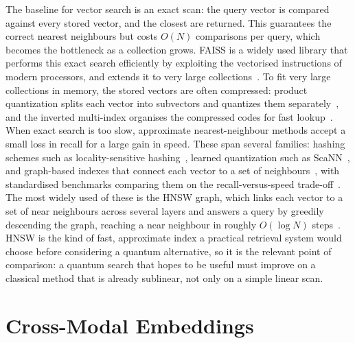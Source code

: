 The baseline for vector search is an exact scan: the query vector is compared
against every stored vector, and the closest are returned. This guarantees the
correct nearest neighbours but costs $O(N)$ comparisons per query, which becomes
the bottleneck as a collection grows. FAISS is a widely used library that
performs this exact search efficiently by exploiting the vectorised instructions
of modern processors, and extends it to very large
collections~\cite{johnson2019faiss}. To fit very large collections in memory,
the stored vectors are often compressed: product quantization splits each vector
into subvectors and quantizes them separately~\cite{jegou2011pq}, and the
inverted multi-index organises the compressed codes for fast
lookup~\cite{babenko2015multiindex}. When exact search is too slow, approximate
nearest-neighbour methods accept a small loss in recall for a large gain in
speed. These span several families: hashing schemes such as locality-sensitive
hashing~\cite{datar2004lsh}, learned quantization such as
ScaNN~\cite{guo2020scann}, and graph-based indexes that connect each vector to a
set of neighbours~\cite{fu2019nsg,subramanya2019diskann}, with standardised
benchmarks comparing them on the recall-versus-speed
trade-off~\cite{aumuller2020annbenchmarks}. The most widely used of these is the
HNSW graph, which links each vector to a set of near neighbours across several
layers and answers a query by greedily descending the graph, reaching a near
neighbour in roughly $O(\log N)$ steps~\cite{malkov2020hnsw}. HNSW is the kind of
fast, approximate index a
practical retrieval system would choose before considering a quantum
alternative, so it is the relevant point of comparison: a quantum search that
hopes to be useful must improve on a classical method that is already sublinear,
not only on a simple linear scan.

\section{Cross-Modal Embeddings}
\label{sec:lit:embeddings}


